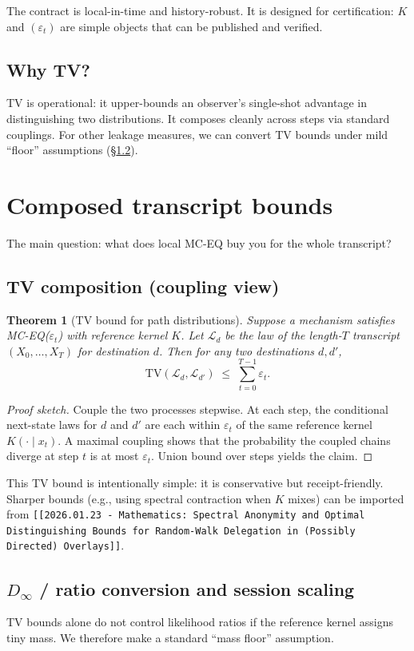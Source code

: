 \documentclass[11pt]{article}
\newtheorem{theorem}{Theorem}
\newcommand{\TV}{\mathrm{TV}}
\newcommand{\eps}{\varepsilon}
\begin{document}
The contract is local-in-time and history-robust.
It is designed for certification: $K$ and $(\eps_t)$ are simple objects that can be published and verified.

\subsection{Why TV?}
TV is operational: it upper-bounds an observer's single-shot advantage in distinguishing two distributions.
It composes cleanly across steps via standard couplings.
For other leakage measures, we can convert TV bounds under mild ``floor'' assumptions (\S\ref{sec:linfty}).

\section{Composed transcript bounds}
The main question: what does local MC-EQ buy you for the whole transcript?

\subsection{TV composition (coupling view)}
\begin{theorem}[TV bound for path distributions]
Suppose a mechanism satisfies MC-EQ($\eps_t$) with reference kernel $K$.
Let $\mathcal{L}_d$ be the law of the length-$T$ transcript $(X_0,\dots,X_T)$ for destination $d$.
Then for any two destinations $d,d'$,
\[
\TV(\mathcal{L}_d,\mathcal{L}_{d'})\;\le\; \sum_{t=0}^{T-1} \eps_t.
\]
\end{theorem}
\begin{proof}[Proof sketch]
Couple the two processes stepwise.
At each step, the conditional next-state laws for $d$ and $d'$ are each within $\eps_t$ of the same reference kernel $K(\cdot\mid x_t)$.
A maximal coupling shows that the probability the coupled chains diverge at step $t$ is at most $\eps_t$.
Union bound over steps yields the claim.
\end{proof}

This TV bound is intentionally simple: it is conservative but receipt-friendly.
Sharper bounds (e.g., using spectral contraction when $K$ mixes) can be imported from \texttt{[[2026.01.23 - Mathematics: Spectral Anonymity and Optimal Distinguishing Bounds for Random-Walk Delegation in (Possibly Directed) Overlays]]}.

\subsection{$D_\infty$ / ratio conversion and session scaling}
\label{sec:linfty}
TV bounds alone do not control likelihood ratios if the reference kernel assigns tiny mass.
We therefore make a standard ``mass floor'' assumption.
\end{document}
